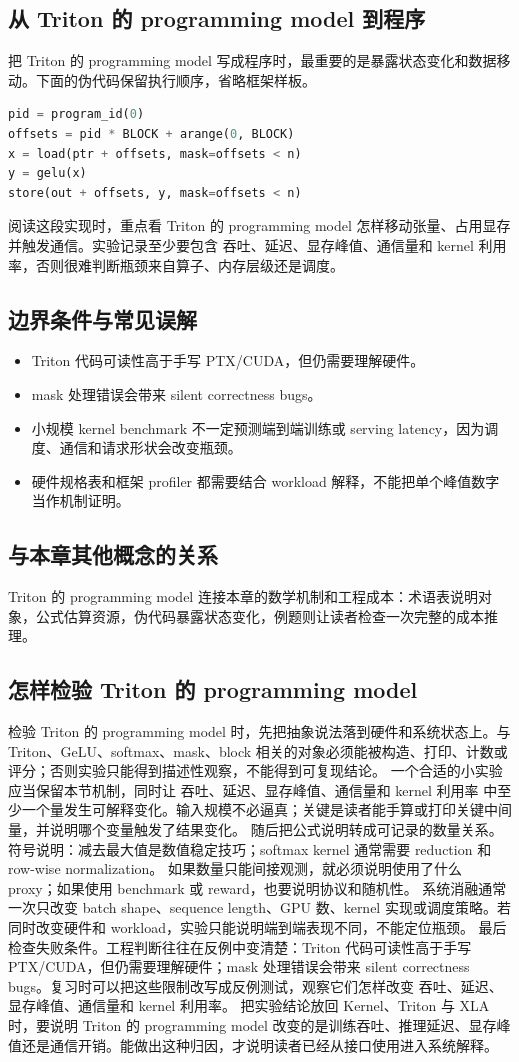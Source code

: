 \documentclass[a4paper]{article}
\begin{document}
\subsection{从 Triton 的 programming model 到程序}
把 Triton 的 programming model 写成程序时，最重要的是暴露状态变化和数据移动。下面的伪代码保留执行顺序，省略框架样板。
\begin{lstlisting}[language=Python]
pid = program_id(0)
offsets = pid * BLOCK + arange(0, BLOCK)
x = load(ptr + offsets, mask=offsets < n)
y = gelu(x)
store(out + offsets, y, mask=offsets < n)
\end{lstlisting}
阅读这段实现时，重点看 Triton 的 programming model 怎样移动张量、占用显存并触发通信。实验记录至少要包含 吞吐、延迟、显存峰值、通信量和 kernel 利用率，否则很难判断瓶颈来自算子、内存层级还是调度。
\subsection{边界条件与常见误解}
\begin{itemize}
\item Triton 代码可读性高于手写 PTX/CUDA，但仍需要理解硬件。
\item mask 处理错误会带来 silent correctness bugs。
\item 小规模 kernel benchmark 不一定预测端到端训练或 serving latency，因为调度、通信和请求形状会改变瓶颈。
\item 硬件规格表和框架 profiler 都需要结合 workload 解释，不能把单个峰值数字当作机制证明。
\end{itemize}
\subsection{与本章其他概念的关系}
Triton 的 programming model 连接本章的数学机制和工程成本：术语表说明对象，公式估算资源，伪代码暴露状态变化，例题则让读者检查一次完整的成本推理。
\subsection{怎样检验 Triton 的 programming model}
检验 Triton 的 programming model 时，先把抽象说法落到硬件和系统状态上。与 Triton、GeLU、softmax、mask、block 相关的对象必须能被构造、打印、计数或评分；否则实验只能得到描述性观察，不能得到可复现结论。
一个合适的小实验应当保留本节机制，同时让 吞吐、延迟、显存峰值、通信量和 kernel 利用率 中至少一个量发生可解释变化。输入规模不必逼真；关键是读者能手算或打印关键中间量，并说明哪个变量触发了结果变化。
随后把公式说明转成可记录的数量关系。符号说明：减去最大值是数值稳定技巧；softmax kernel 通常需要 reduction 和 row-wise normalization。 如果数量只能间接观测，就必须说明使用了什么 proxy；如果使用 benchmark 或 reward，也要说明协议和随机性。
系统消融通常一次只改变 batch shape、sequence length、GPU 数、kernel 实现或调度策略。若同时改变硬件和 workload，实验只能说明端到端表现不同，不能定位瓶颈。
最后检查失败条件。工程判断往往在反例中变清楚：Triton 代码可读性高于手写 PTX/CUDA，但仍需要理解硬件；mask 处理错误会带来 silent correctness bugs。复习时可以把这些限制改写成反例测试，观察它们怎样改变 吞吐、延迟、显存峰值、通信量和 kernel 利用率。
把实验结论放回 Kernel、Triton 与 XLA 时，要说明 Triton 的 programming model 改变的是训练吞吐、推理延迟、显存峰值还是通信开销。能做出这种归因，才说明读者已经从接口使用进入系统解释。
\end{document}
